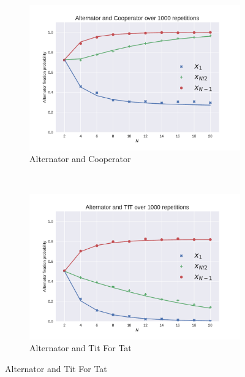 \documentclass[10pt,journal]{IEEEtran}
\begin{document}
\begin{figure}[!hbtp]
    \centering
    \begin{subfigure}[t]{.5\columnwidth}
        \centering
        \includegraphics[width=.95\columnwidth]{img/Alternator_v_Cooperator.pdf}
        \caption{Alternator and Cooperator}
    \end{subfigure}%
    ~
    \begin{subfigure}[t]{.5\columnwidth}
        \centering
        \includegraphics[width=.95\columnwidth]{img/Alternator_v_TfT.pdf}
        \caption{Alternator and Tit For Tat}
    \end{subfigure}%


\end{figure}
\end{document}
